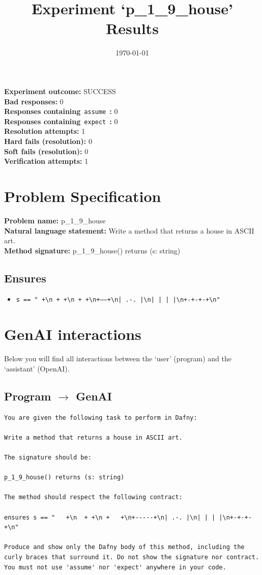 \documentclass{article}
\begin{document}
\title{Experiment `p\_1\_9\_house' Results}
\author{\today}
\date{}
\maketitle
\textbf{Experiment outcome: }SUCCESS
\\\textbf{Bad responses: }0
\\\textbf{Responses containing}~\texttt{assume}~\textbf{: }0
\\\textbf{Responses containing}~\texttt{expect}~\textbf{: }0
\\\textbf{Resolution attempts: }1
\\\textbf{Hard fails (resolution): }0
\\\textbf{Soft fails (resolution): }0
\\\textbf{Verification attempts: }1
\section*{Problem Specification}
\textbf{Problem name: }p\_1\_9\_house
\\\textbf{Natural language statement: }Write a method that returns a house in ASCII art.
\\\textbf{Method signature: }p\_1\_9\_house() returns (s: string)
\subsection*{Ensures}
\begin{itemize}
\item \texttt{s == "   +\textbackslash{}n  + +\textbackslash{}n +   +\textbackslash{}n+-----+\textbackslash{}n| .-. |\textbackslash{}n| | | |\textbackslash{}n+-+-+-+\textbackslash{}n"}
\end{itemize}
\clearpage
\section*{GenAI interactions}
Below you will find all interactions between the `user' (program) and the `assistant' (OpenAI).
\subsection*{Program $\rightarrow$ GenAI}
\begin{lstlisting}
You are given the following task to perform in Dafny:

Write a method that returns a house in ASCII art.

The signature should be:

p_1_9_house() returns (s: string)

The method should respect the following contract:

ensures s == "   +\n  + +\n +   +\n+-----+\n| .-. |\n| | | |\n+-+-+-+\n"

Produce and show only the Dafny body of this method, including the curly braces that surround it. Do not show the signature nor contract. You must not use 'assume' nor 'expect' anywhere in your code.
\end{lstlisting}
\end{document}
